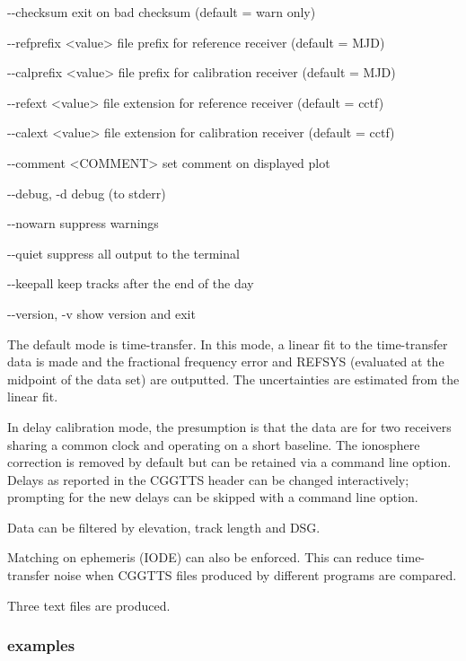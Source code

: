 \begin{description*}
	\item[-{}-checksum]           exit on bad checksum (default = warn only)
	\item[-{}-refprefix \textless{value}\textgreater] file prefix for reference receiver (default = MJD)
	\item[-{}-calprefix \textless{value}\textgreater] file prefix for calibration receiver (default = MJD)
	\item[-{}-refext \textless{value}\textgreater]       file extension for reference receiver (default = cctf)
	\item[-{}-calext \textless{value}\textgreater]       file extension for calibration receiver (default = cctf)
	\item[-{}-comment \textless{COMMENT}\textgreater]     set comment on displayed plot
	\item[-{}-debug, -d]           debug (to stderr)
	\item[-{}-nowarn]              suppress warnings
	\item[-{}-quiet]               suppress all output to the terminal
	\item[-{}-keepall]             keep tracks after the end of the day
	\item[-{}-version, -v]         show version and exit
\end{description*}

The default mode is time-transfer. In this mode, a linear fit to the time-transfer data is made and the 
fractional frequency error and REFSYS (evaluated at the midpoint of the data set) are outputted. 
The uncertainties are estimated from the linear fit.

In delay calibration mode, the presumption is that the data are for two receivers sharing a
common clock and operating on a short baseline. The ionosphere correction is removed by default
but can be retained via a command line option. Delays as reported in the CGGTTS header can be 
changed interactively; prompting for the new delays can be skipped with a command line option.

Data can be filtered by elevation, track length and DSG.

Matching on ephemeris (IODE) can also be enforced. 
This can reduce time-transfer noise when CGGTTS files produced by different programs are compared.

Three text files are produced.

\subsubsection{examples}

